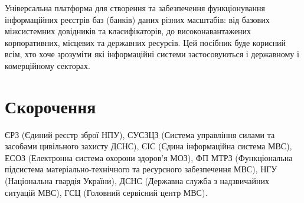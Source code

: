 Універсальна платформа для створення та забезпечення функціонування
інформаційних реєстрів баз (банків) даних різних масштабів: від базових
міжсистемних довідників та класифікаторів, до високонавантажених корпоративних,
місцевих та державних ресурсів. Цей посібник буде корисний всім,
хто хоче зрозуміти які інформаційні системи застосовуються і
державному і комерційному секторах.

\section*{Скорочення}

ЄРЗ (Єдиний реєстр зброї НПУ),
СУСЗЦЗ (Система управління силами та засобами цивільного захисту ДСНС),
ЄІС (Єдина інформаційна система МВС),
ЕСОЗ (Електронна система охорони здоров'я МОЗ),
ФП МТРЗ (Функціональна підсистема матеріально-технічного та ресурсного забезпечення МВС),
НГУ (Національна гвардія України),
ДСНС (Державна служба з надзвичайних ситуацій МВС),
ГСЦ (Головний сервісний центр МВС).

